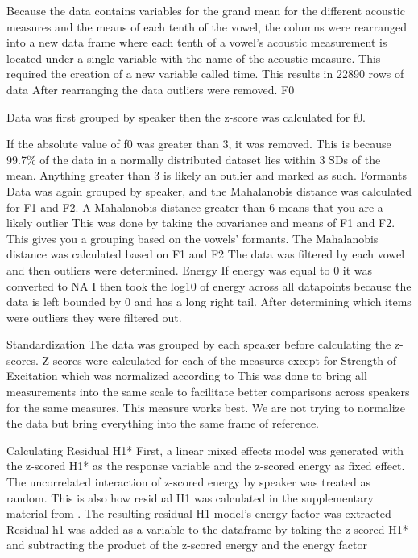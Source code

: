 \documentclass[12pt, letterpaper]{article}
\begin{document}
Because the data contains variables for the grand mean for the different acoustic measures and the means of each tenth of the vowel, the columns were rearranged into a new data frame where each tenth of a vowel’s acoustic measurement is located under a single variable with the name of the acoustic measure. 
This required the creation of a new variable called time. 
This results in 22890 rows of data
After rearranging the data outliers were removed. 
F0

Data was first grouped by speaker then the z-score was calculated for f0. 

If the absolute value of f0 was greater than 3, it was removed. This is because 99.7\% of the data in a normally distributed dataset lies within 3 SDs of the mean. Anything greater than 3 is likely an outlier and marked as such.
Formants
Data was again grouped by speaker, and the Mahalanobis distance \citep{martosGeneralizationMahalanobisDistance2013,
mahalanobisGeneralizedDistanceStatistics2018,drumondUsingMahalanobisDistance2019} was calculated for F1 and F2. 
A Mahalanobis distance greater than 6 means that you are a likely outlier
This was done by taking the covariance and means of F1 and F2. This gives you a grouping based on the vowels’ formants. 
The Mahalanobis distance was calculated based on F1 and F2
The data was filtered by each vowel and then outliers were determined. 
Energy
If energy was equal to 0 it was converted to NA
I then took the log10  of energy across all datapoints because the data is left bounded by 0 and has a long right tail. 
After determining which items were outliers they were filtered out.

Standardization
The data was grouped by each speaker before calculating the z-scores.
Z-scores were calculated for each of the measures except for Strength of Excitation which was normalized according to \citet{garellekVoicingGlottalConsonants2021}
This was done to bring all measurements into the same scale to facilitate better comparisons across speakers for the same measures.
This measure works best. We are not trying to normalize the data but bring everything into the same frame of reference.

Calculating Residual H1*
First, a linear mixed effects model was generated with the z-scored H1* as the response variable and the z-scored energy as fixed effect. 
The uncorrelated interaction of z-scored energy by speaker was treated as random. 
This is also how residual H1 was calculated in the supplementary material from \citet{chaiH1H2Acoustic2022}.
The resulting residual H1 model’s energy factor was extracted
Residual h1 was added as a variable to the dataframe by taking the z-scored H1* and subtracting the product of the z-scored energy and the energy factor 
\end{document}
